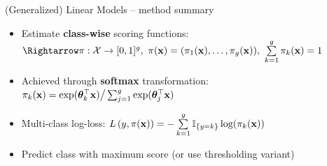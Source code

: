 \begin{vbframe}{(Generalized) Linear Models -- method summary}
\medskip


\medskip


\begin{itemize}
  \item Estimate \textbf{class-wise} scoring functions:
  $\Rightarrow \pi: \Xspace \rightarrow \unitint^g, ~
  \pix = (\pikx[1], \dots, \pikx[g]), ~\sumkg \pikx = 1$
  \item Achieved through \textbf{softmax} transformation: 
  $\pi_{k}(\mathbf{x}) = \exp(\bm{\theta}_k^\top \mathbf{x}) \big/ \sum_{j=1}^g \exp(\bm{\theta}_j^\top 
  \mathbf{x})  $
  \item Multi-class log-loss: $L\left(y, \pi(\mathbf{x})\right) = - \sum\limits_{k=1}^g \mathbb{I}_{\{y = k\}} \log(\pi_{k}(\mathbf{x}))$
  \item Predict class with maximum score (or use thresholding variant)
\end{itemize}


\end{vbframe}



